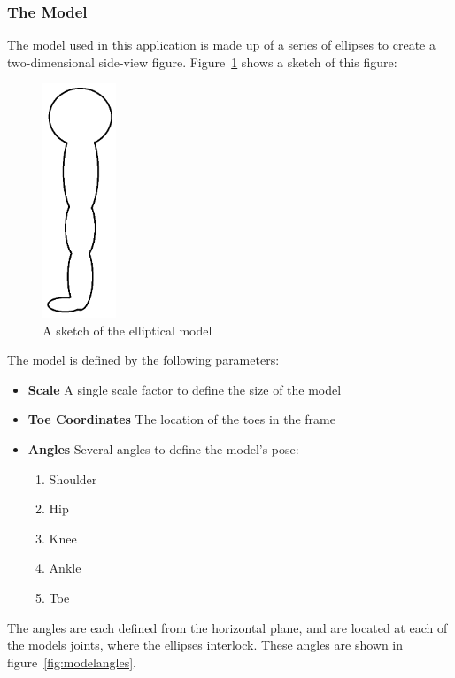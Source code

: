 \subsubsection{The Model}
\label{subsec:model}

The model used in this application is made up of a series of ellipses to create a two-dimensional side-view figure. Figure~\ref{fig:modelellipses} shows a sketch of this figure:

\begin{figure}[H]
    \centering
	\includegraphics[height=7cm]{algorithm/images/model}
\caption{A sketch of the elliptical model}
\label{fig:modelellipses}
\end{figure}

The model is defined by the following parameters:

\begin{itemize}
	\item \textbf{Scale} A single scale factor to define the size of the model
	\item \textbf{Toe Coordinates} The location of the toes in the frame
	\item \textbf{Angles} Several angles to define the model's pose:
		\begin{enumerate}
			\item Shoulder
			\item Hip
			\item Knee
			\item Ankle
			\item Toe
		\end{enumerate}
\end{itemize}

The angles are each defined from the horizontal plane, and are located at each of the models joints, where the ellipses interlock. These angles are shown in figure~\ref{fig:modelangles}.

